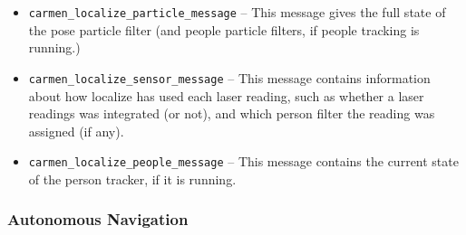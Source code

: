 \documentclass{article}
\begin{document}
\begin{itemize}
\item \verb!carmen_localize_particle_message! -- This message gives the full
state of the pose particle filter (and people particle filters, if people
tracking is running.)

\item \verb!carmen_localize_sensor_message! -- This message contains
information about how localize has used each laser reading, such as whether a
laser readings was integrated (or not), and which person filter the reading
was assigned (if any).

\item \verb!carmen_localize_people_message! -- This message contains the
current state of the person tracker, if it is running. 
\end{itemize}

\subsubsection{Autonomous Navigation}
\end{document}
